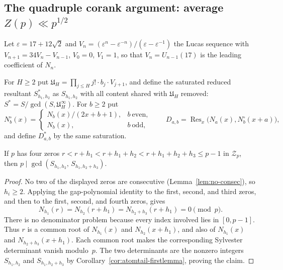 \subsection{The quadruple corank argument: average $Z(p)\ll p^{1/2}$}
\label{ssec:quadcorank}

Let $\varepsilon=17+12\sqrt2$ and
$V_n=(\varepsilon^n-\varepsilon^{-n})/(\varepsilon-\varepsilon^{-1})$
the Lucas sequence with $V_{n+1}=34V_n-V_{n-1}$, $V_0=0$, $V_1=1$,
so that $V_{n}=U_{n-1}(17)$ is the leading coefficient of $N_{n}$.

\begin{definition}
For $H\ge2$ put
$\mathfrak U_H=\prod_{j\le H} j!\cdot b_j\cdot V_{j+1}$,
and define the saturated reduced resultant
$S^*_{h_1,h_2}$ as $S_{h_1,h_2}$ with all content shared with
$\mathfrak U_H$ removed:
$S^*=S/\gcd(S,\mathfrak U_H^\infty)$.
For $b\ge2$ put
\[
 N_b^\circ(x)=
 \begin{cases}
  N_b(x)/(2x+b+1),&b\ \text{even},\\
  N_b(x),&b\ \text{odd},
 \end{cases}
 \qquad
 D_{a,b}=\operatorname{Res}_x
 \bigl(N_a(x),N_b^\circ(x+a)\bigr),
\]
and define $D^*_{a,b}$ by the same saturation.
\end{definition}

\begin{lemma}\label{lem:qc-cert}
If $p$ has four zeros
$r<r{+}h_1<r{+}h_1{+}h_2<r{+}h_1{+}h_2{+}h_3\le p{-}1$
in $\mathcal Z_p$, then
$p\mid\gcd(S_{h_1,h_2},\,S_{h_1,h_2+h_3})$.
\end{lemma}

\begin{proof}
No two of the displayed zeros are consecutive
(Lemma~\ref{lem:no-consec}), so $h_i\ge2$.  Applying the gap-polynomial
identity to the first, second, and third zeros, and then to the first,
second, and fourth zeros, gives
\[
 N_{h_1}(r)=N_{h_2}(r+h_1)
 =N_{h_2+h_3}(r+h_1)=0\pmod p.
\]
There is no denominator problem because every index involved lies in
$[0,p-1]$.  Thus $r$ is a common root of
$N_{h_1}(x)$ and $N_{h_2}(x+h_1)$, and also of
$N_{h_1}(x)$ and $N_{h_2+h_3}(x+h_1)$.  Each common root makes the
corresponding Sylvester determinant vanish modulo~$p$.  The two
determinants are the nonzero integers $S_{h_1,h_2}$ and
$S_{h_1,h_2+h_3}$ by Corollary~\ref{cor:atomtail-firstlemma}, proving the
claim.
\end{proof}

